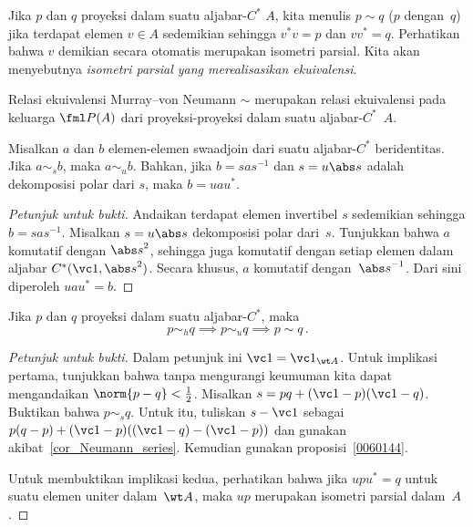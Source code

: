 \begin{notn} Jika $p$ dan $q$ proyeksi dalam suatu aljabar-$C^*$ $A$, kita menulis $p \sim q$
($p$  dengan~$q$) jika terdapat elemen $v \in A$
sedemikian sehingga $v^*v = p$ dan $vv^* = q$. Perhatikan bahwa $v$ demikian secara otomatis merupakan isometri
parsial. Kita akan menyebutnya
\emph{isometri parsial yang merealisasikan ekuivalensi}.
\end{notn}

\begin{prop}\label{0060216} Relasi ekuivalensi Murray--von Neumann $\sim$ merupakan
relasi ekuivalensi pada keluarga $\fml P(A)$ dari proyeksi-proyeksi dalam suatu aljabar-$C^*$~$A$.
\end{prop}

\begin{prop}\label{0060144} Misalkan $a$ dan $b$ elemen-elemen swaadjoin dari suatu aljabar-$C^*$ beridentitas. Jika $a \sim_s b$, maka $a \sim_u b$.
Bahkan, jika $b = sas^{-1}$ dan $s = u\abs s$ adalah dekomposisi polar dari $s$, maka $b = uau^*$.
\end{prop}

\begin{proof}[\emph{Petunjuk untuk bukti}] Andaikan terdapat elemen invertibel $s$ sedemikian sehingga $b = sas^{-1}$. Misalkan $s = u\abs s$
dekomposisi polar dari~$s$. Tunjukkan bahwa $a$ komutatif dengan ${\abs s}^2$, sehingga juga komutatif dengan setiap elemen dalam aljabar $C^*(\vc 1,{\abs s}^2)$.
Secara khusus, $a$ komutatif dengan~${\abs s}^{-1}$. Dari sini diperoleh $uau^* = b$.   \ns
\end{proof}

\begin{prop}\label{0060221} Jika $p$ dan $q$ proyeksi dalam suatu aljabar-$C^*$, maka
   \[ p \sim_h q \implies p \sim_u q \implies p \sim q\,. \]
\end{prop}

\begin{proof}[\emph{Petunjuk untuk bukti}] Dalam petunjuk ini $\vc 1 = \vc 1_{\wt A}$. Untuk implikasi pertama, tunjukkan bahwa tanpa mengurangi keumuman
kita dapat mengandaikan $\norm{p - q} < \frac12$. Misalkan $s = pq + (\vc 1 - p)(\vc 1 - q)$. Buktikan bahwa $p \sim_s q$. Untuk
itu, tuliskan $s - \vc 1$ sebagai $p(q - p) + (\vc 1 - p)((\vc 1 - q) - (\vc 1 - p))$ dan gunakan akibat~\ref{cor_Neumann_series}.
Kemudian gunakan proposisi~\ref{0060144}.

Untuk membuktikan implikasi kedua, perhatikan bahwa jika $upu^* = q$ untuk suatu elemen uniter dalam~$\wt A$, maka $up$ merupakan isometri parsial
dalam~$A$.  \ns
\end{proof}

